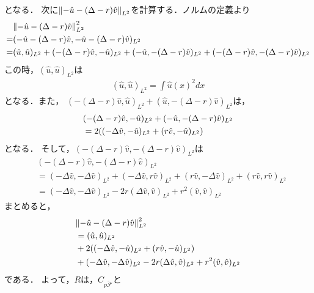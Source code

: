 となる．
次に\(\norm{-\hat{u}-(\Delta-r)\hat{v}}_{L^2}\)を計算する．ノルムの定義より
\begin{align}
  &\norm{-\hat{u}-(\Delta - r)\hat{v}}^2_{L^2}\\
  =&(-\hat{u}-(\Delta - r)\hat{v},-\hat{u}-(\Delta - r)\hat{v})_{L^2}\\
  =&(\hat{u},\hat{u})_{L^2}+(-(\Delta - r)\hat{v},-\hat{u})_{L^2}+(-\hat{u},-(\Delta - r)\hat{v})_{L^2}+(-(\Delta - r)\hat{v},-(\Delta - r)\hat{v})_{L^2}
\end{align}
この時，\((\hat{u},\hat{u})_{L^2}\)は
\begin{align}
  (\hat{u},\hat{u})_{L^2}=\int \hat{u}(x)^2 dx
\end{align}
となる．また，
\((-(\Delta - r)\hat{v},\hat{u})_{L^2}
  +(\hat{u},-(\Delta - r)\hat{v})_{L^2}\)は，
  \begin{align}
    &(-(\Delta - r)\hat{v},-\hat{u})_{L^2}+(-\hat{u},-(\Delta - r)\hat{v})_{L^2}\\
    &=2\qty((-\Delta \hat{v},-\hat{u})_{L^2}+(r \hat{v},-\hat{u})_{L^2})
  \end{align}
となる．
そして，\((-(\Delta - r)\hat{v},-(\Delta - r)\hat{v})_{L^2}\)は
\begin{align}
  &(-(\Delta - r)\hat{v},-(\Delta - r)\hat{v})_{L^2}\\
  &=(-\Delta \hat{v},-\Delta \hat{v})_{L^2}
  +(-\Delta \hat{v},r \hat{v})_{L^2}
  +(r \hat{v},-\Delta \hat{v})_{L^2}
  +(r \hat{v},r \hat{v})_{L^2}\\
  &=(-\Delta \hat{v},-\Delta \hat{v})_{L^2}
  -2r(\Delta \hat{v}, \hat{v})_{L^2}
  +r^2( \hat{v}, \hat{v})_{L^2}
\end{align}
まとめると，
\begin{align}
  &\norm{-\hat{u}-(\Delta-r)\hat{v}}_{L^2}^2\\
  &=
  (\hat{u},\hat{u})_{L^2}\\
  &+2\qty((-\Delta \hat{v},-\hat{u})_{L^2}+(r \hat{v},-\hat{u})_{L^2})\\
  &+(-\Delta \hat{v},-\Delta \hat{v})_{L^2}
  -2r(\Delta \hat{v}, \hat{v})_{L^2}
  +r^2( \hat{v}, \hat{v})_{L^2}
\end{align}
である．
よって，\(R\)は，\(C_{p\tilde{\mathcal{F}}}\)と
